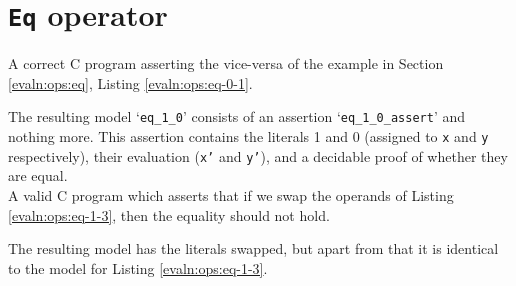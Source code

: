 \section{\texttt{Eq} operator}\label{app:evaln:ops:eq}
    
    
    A correct C program asserting the vice-versa of the example in Section \ref{evaln:ops:eq}, Listing \ref{evaln:ops:eq-0-1}.
    
    The resulting model `\texttt{eq\_1\_0}' consists of an assertion `\texttt{eq\_1\_0\_assert}' and nothing more. This assertion contains the literals 1 and 0 (assigned to \texttt{x} and \texttt{y} respectively), their evaluation (\texttt{x'} and \texttt{y'}), and a decidable proof of whether they are equal.
    \\
    
    
    
    A valid C program which asserts that if we swap the operands of Listing \ref{evaln:ops:eq-1-3}, then the equality should not hold.
    
    
    The resulting model has the literals swapped, but apart from that it is identical to the model for Listing \ref{evaln:ops:eq-1-3}.
